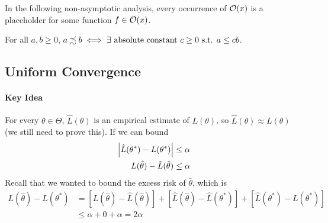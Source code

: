 \documentclass[11pt]{article}
\newcommand{\thetahat}[0]{\hat{\theta}}
\newcommand{\suchthat}[0]{\text{ s.t. }}
\begin{document}
	In the following non-asymptotic analysis, every occurrence of $\mathcal{{O}}(x)$ is a placeholder for some function $f \in \mathcal{{O}}(x)$.
		
	For all $a, b \geq 0$, $a \precsim b \iff \exists \tx{ absolute constant } c \geq 0 \suchthat a \leq c b$.
	
	\subsection{Uniform Convergence}
	\paragraph{Key Idea} For every $\theta \in \Theta$, $\hat{L}(\theta)$ is an empirical estimate of $L(\theta)$, so $\hat{L}(\theta) \approx L(\theta)$ (we still need to prove this).
	If we can bound
	\begin{align}
		\abs{\hat{L}(\theta^*) - L(\theta^*)} \leq \alpha \\
		L(\thetahat) - \hat{L}(\thetahat) \leq \alpha
	\end{align}
	Recall that we wanted to bound the excess risk of $\thetahat$, which is
	\begin{align}
		L(\thetahat) - L(\theta^*) &= [L(\thetahat) - \hat{L}(\thetahat)] + [\hat{L}(\thetahat) - \hat{L}(\theta^*)] + [\hat{L}(\theta^*) - L(\theta^*)] \\
		&\leq \alpha + 0 + \alpha = 2 \alpha
	\end{align}
\end{document}

